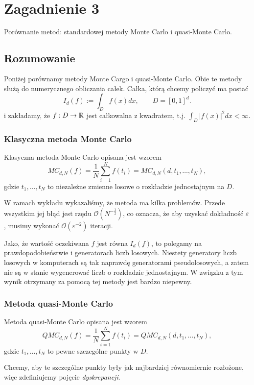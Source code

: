 \documentclass[a4paper,12pt]{article}
\begin{document}
\newpage
\section*{Zagadnienie 3}
Porównanie metod: standardowej metody Monte Carlo i quasi-Monte Carlo.

\subsection*{Rozumowanie}

Poniżej porównamy metody Monte Cargo i quasi-Monte Carlo. Obie te metody
służą do numerycznego obliczania całek. Całka, którą chcemy policzyć
ma postać
$$
    I_d(f) := \int_{D} f(x) dx, \qquad D = [0, 1]^d.
$$
i zakładamy, że $f : D \to \mathbb{R}$ jest całkowalna z kwadratem, t.j.
$
    \int_{D} |f(x)|^2 dx < \infty.
$

\subsubsection*{Klasyczna metoda Monte Carlo}
Klasyczna metoda Monte Carlo opisana jest wzorem
$$
    MC_{d, N}(f) = \frac{1}{N} \sum_{i=1}^{N} f(t_i) = MC_{d, N}(d, t_1, \dots, t_N),
$$
gdzie $t_1, \dots, t_N$ to niezależne zmienne losowe o rozkładzie jednostajnym na $D$.

W ramach wykładu wykazaliśmy, że metoda ma kilka problemów. Przede wszystkim
jej błąd jest rzędu $\mathcal{O}(N^{-\frac{1}{2}})$, co oznacza, że aby uzyskać
dokładność $\varepsilon$, musimy wykonać $\mathcal{O}(\varepsilon^{-2})$ iteracji.

Jako, że wartość oczekiwana $f$ jest równa $I_d(f)$, to polegamy na prawdopodobieństwie
i generatorach liczb losowych. Niestety generatory liczb losowych w komputerach
są tak naprawdę generatorami pseudolosowych, a zatem nie są w stanie wygenerować
liczb o rozkładzie jednostajnym.
W związku z tym wynik otrzymany za pomocą tej metody jest bardzo niepewny.

\subsubsection*{Metoda quasi-Monte Carlo}

Metoda quasi-Monte Carlo opisana jest wzorem
$$
    QMC_{d, N}(f) = \frac{1}{N} \sum_{i=1}^{N} f(t_i) = QMC_{d, N}(d, t_1, \dots, t_N),
$$
gdzie $t_1, \dots, t_N$ to pewne szczególne punkty w $D$.

Chcemy, aby te szczególne punkty były jak najbardziej równomiernie rozłożone,
więc zdefiniujemy pojęcie \textit{dyskrepancji}.
\end{document}
